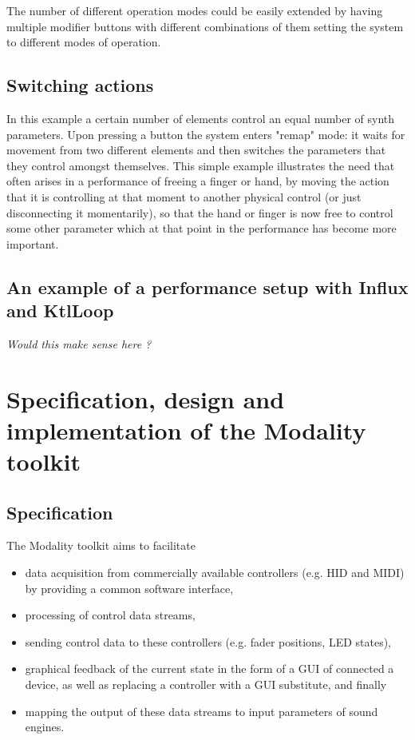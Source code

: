 \documentclass{article}
\begin{document}
The number of different operation modes could be easily extended by having multiple modifier buttons with different combinations of them setting the system to different modes of operation.
       
\subsection{Switching actions}
\label{sub:switching_actions}

In this example a certain number of elements control an equal number of synth parameters. Upon pressing a button the system enters "remap" mode: it waits for movement from two different elements and then switches the parameters that they control amongst themselves. This simple example illustrates the need that often arises in a performance of freeing a finger or hand, by moving the action that it is controlling at that moment to another physical control (or just disconnecting it momentarily), so that the hand or finger is now free to control some other parameter which at that point in the performance has become more important. 

\subsection{An example of a performance setup with Influx and KtlLoop}

\emph{Would this make sense here ?}



\section{Specification, design and implementation of the Modality toolkit}
\label{sec:implementation}

\subsection{Specification}
\label{sub:specification}

The Modality toolkit aims to facilitate
\begin{itemize}
	\item data acquisition from commercially available controllers (e.g. HID and MIDI) by providing a common software interface,
	\item processing of control data streams,
	\item sending control data to these controllers (e.g. fader positions, LED states),
	\item graphical feedback  of the current state in the form of a GUI of connected a device, as well as replacing a controller with a GUI substitute, and finally
	\item mapping the output of these data streams to input parameters of sound engines.
\end{itemize}
\end{document}
